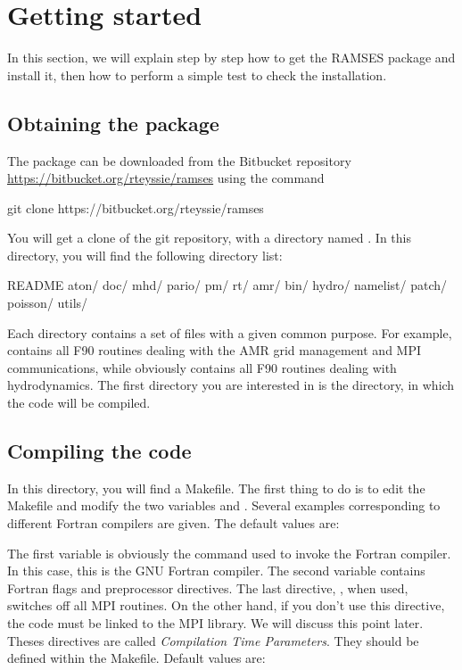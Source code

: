 \clearpage
\section{Getting started}

In this section, we will explain step by step how to get the RAMSES
package and install it, then how to perform a simple test to check the
installation.

\subsection{Obtaining the package}

The package can be downloaded from the Bitbucket repository
\url{https://bitbucket.org/rteyssie/ramses} using the command
\begin{Prompt}
git clone https://bitbucket.org/rteyssie/ramses
\end{Prompt}
You will get a clone of the git repository, with a directory named .
In this directory, you will find the following directory list:

\begin{Prompt}
README    aton/     doc/      mhd/      pario/    pm/       rt/
amr/      bin/      hydro/    namelist/ patch/    poisson/  utils/
\end{Prompt}

Each directory contains a set of files with a given common purpose. For
example,  contains all F90 routines dealing with the AMR grid
management and MPI communications, while  obviously contains
all F90 routines dealing with hydrodynamics. The first directory you are
interested in is the  directory, in which the code will be
compiled.

\subsection{Compiling the code}

In this  directory, you will find a Makefile. The first thing
to do is to edit the Makefile and modify the two variables 
and . Several examples corresponding to different Fortran
compilers are given. The default values are:


The first variable is obviously the command used to invoke the Fortran
compiler. In this case, this is the GNU Fortran compiler. The second
variable contains Fortran flags and preprocessor directives. The last
directive, , when used, switches off all MPI
routines. On the other hand, if you don't use this directive, the code
must be linked to the MPI library. We will discuss this point later.
Theses directives are called \emph{Compilation Time Parameters}.  They
should be defined within the Makefile. Default values are:

